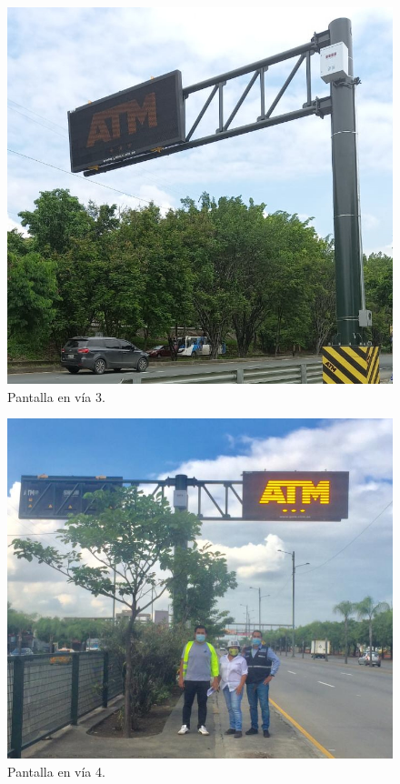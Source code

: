 \begin{figure}[htpb]
	\centering
	\includegraphics[scale=2]{Figures/calle3.jpg} 
	\caption{Pantalla en vía 3.}
	\label{fig: calle3}
\end{figure}

\begin{figure}[htpb]
	\centering
	\includegraphics[scale=0.6]{Figures/calle4.jpg} 
	\caption{Pantalla en vía 4.}
	\label{fig: calle4}
\end{figure}